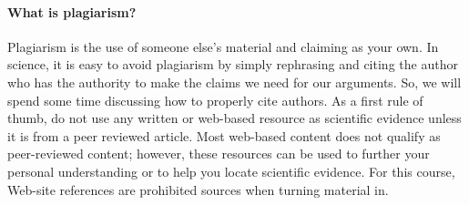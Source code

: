 \paragraph{What is plagiarism?} Plagiarism is the use of someone else's material and claiming as your own. In science, it is easy to avoid plagiarism by simply rephrasing and citing the author who has the authority to make the claims we need for our arguments. So, we will spend some time discussing how to properly cite authors. As a first rule of thumb, do not use any written or web-based resource as scientific evidence unless it is from a peer reviewed article. Most web-based content does not qualify as peer-reviewed content; however, these resources can be used to further your personal understanding or to help you locate scientific evidence. For this course, Web-site references are prohibited sources when turning material in.


